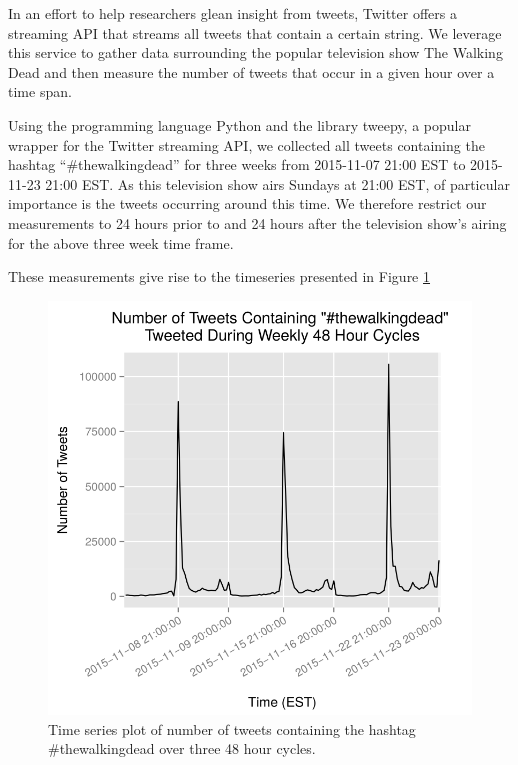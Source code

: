 In an effort to help researchers glean insight from tweets, Twitter offers
a streaming API that streams all tweets that contain a certain string.
We leverage this service to gather data surrounding the popular television
show The Walking Dead and then measure the number of tweets that occur in a given
hour over a time span.

Using the programming language Python and the library tweepy, a popular
wrapper for the Twitter streaming API, we collected all tweets containing the
hashtag ``\#thewalkingdead'' for three weeks from 2015-11-07 21:00 EST to
2015-11-23 21:00 EST. As this television show airs Sundays at 21:00 EST,
of particular importance is the tweets occurring around this time.
We therefore restrict our measurements to 24 hours prior to and 24 hours after
the television show's airing for the above three week time frame.

These measurements give rise to the timeseries presented in Figure \ref{tweets_plot}

\begin{figure}[!T]
  \centerline{\includegraphics{../analysis/plots/tweets_plot}}
  \caption{Time series plot of number of tweets containing the hashtag
  \#thewalkingdead over three 48 hour cycles.}\label{tweets_plot}
\end{figure}
